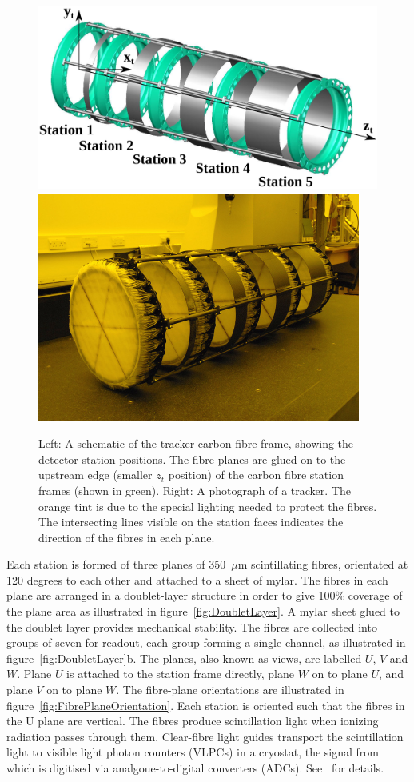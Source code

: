   \begin{figure}[tbh]
    \centering
    \includegraphics[width=0.5\linewidth]{01-MICE/TrackerFrame.pdf} \hspace{2pc}%
    \includegraphics[width=0.35\linewidth]{01-MICE/TrackerPhoto.pdf}
    \caption{\label{fig:Trackers} Left: A schematic of the tracker carbon fibre frame, showing the detector station positions.  The fibre planes are glued on to the upstream edge (smaller $z_t$ position) of the carbon fibre station frames (shown in green). Right: A photograph of a tracker. The orange tint is due to the special lighting needed to protect the fibres. The intersecting lines visible on the station faces indicates the direction of the fibres in each plane.}
  \end{figure}

  Each station is formed of three planes of 350~$\mu$m scintillating fibres, orientated at 120 degrees to each other and attached to a sheet of mylar. The fibres in each plane are arranged in a doublet-layer structure in order to give 100$\%$ coverage of the plane area as illustrated in figure~\ref{fig:DoubletLayer}. A mylar sheet glued to the doublet layer provides mechanical stability. The fibres are collected into groups of seven for readout, each group forming a single channel, as illustrated in figure~\ref{fig:DoubletLayer}b. The planes, also known as views, are labelled $U$, $V$ and $W$. Plane $U$ is attached to the station frame directly, plane $W$ on to plane $U$, and plane $V$ on to plane $W$. The fibre-plane orientations are illustrated in figure~\ref{fig:FibrePlaneOrientation}. Each station is oriented such that the fibres in the U plane are vertical. The fibres produce scintillation light when ionizing radiation passes through them. Clear-fibre light guides transport the scintillation light to visible light photon counters (VLPCs) in a cryostat, the signal from which is digitised via analgoue-to-digital converters (ADCs). See~\cite{MiceTrackers} for details.

